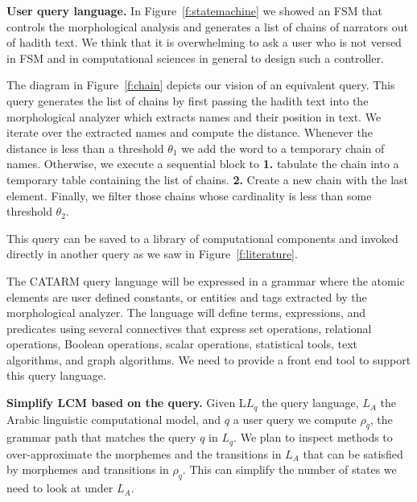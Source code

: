 \documentclass[12pt]{article}
\begin{document}
{\bf User query language. }
In Figure~\ref{f:statemachine} we showed an FSM 
that controls the morphological analysis and generates a
list of chains of narrators out of hadith text.
We think that it is overwhelming to ask a user who is not 
versed in FSM and in computational sciences in general 
to design such a controller. 

The diagram in Figure~\ref{f:chain} depicts our vision of 
an equivalent query.
This query generates the list of chains by first passing the 
hadith text into the morphological analyzer which 
extracts names and their position in text. 
We iterate over the extracted names and compute the distance.
Whenever the distance is less than a threshold $\theta_1$
we add the word to a temporary chain of names. 
Otherwise, we execute a sequential block to 
{\bf 1.} tabulate the chain into a temporary table containing 
the list of chains. 
{\bf 2.} Create a new chain with the last element.
Finally, we filter those chains whose cardinality 
is less than some threshold  $\theta_2$.

This query can be saved to a library of computational components
and invoked directly in another query 
as we saw in Figure~\ref{f:literature}.

\begin{figure}
\end{figure}

The CATARM query language will be expressed in a grammar 
where the atomic elements are user defined constants, or
entities and tags extracted by the morphological analyzer. 
The language will define terms, expressions, and predicates
using several connectives that express set operations, 
relational operations, Boolean operations, scalar operations, 
statistical tools, text algorithms, and graph algorithms. 
We need to provide a front end tool to support this query
language.

{\bf Simplify LCM based on the query.}
Given
L$L_q$ the query language, 
$L_A$ the Arabic linguistic
computational model, and  $q$ a user query
we compute $\rho_q$, the grammar path that matches 
the query $q$ in $L_q$. 
We plan to inspect methods to over-approximate 
the morphemes and the transitions in $L_A$ 
that can be satisfied by morphemes and transitions
in $\rho_q$. 
This can simplify the number of states we need to 
look at under $L_A$. 
\end{document}
